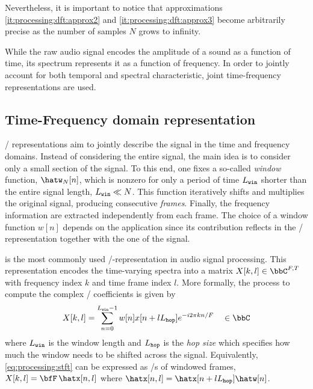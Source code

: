Nevertheless, it is important to notice that approximations \ref{it:processing:dft:approx2} and \ref{it:processing:dft:approx3} become arbitrarily precise as the number of samples $N$ grows to infinity.

\mynewline
While the raw audio signal encodes the amplitude of a sound as a function of time,
its spectrum represents it as a function of frequency.
In order to jointly account for both temporal and spectral characteristic, joint time-frequency representations are used.

\subsection{Time-Frequency domain representation}
\TFdef/ representations aim to jointly describe the signal in the time and frequency domains.
Instead of considering the entire signal, the main idea is to consider only a small section of the signal.
To this end, one fixes a so-called \textit{window} function, $\hatw_N[n]$, which is nonzero for only a period of time $L_\mathtt{win}$ shorter than the entire signal length, $L_\mathtt{win} \ll N$.
This function iteratively shifts and multiplies the original signal, producing consecutive \textit{frames}.
Finally, the frequency information are extracted independently from each frame.
The choice of a window function $w[n]$ depends on the application since its contribution reflects in the \TF/ representation together with the
one of the signal.

is the most commonly used \TF/-representation in audio signal processing.
This representation encodes the time-varying spectra into a matrix $X[k,l] \in \bbC^{F,T}$ with frequency index $k$ and time frame index $l$.
More formally, the process to compute the complex \STFT/ coefficients is given by
\begin{equation}\label{eq:processing:stft}
    X[k, l]  = \sum_{n=0}^{\winsize-1} w[n] x[n + l \hopsize] \cste^{- \csti 2 \pi k n / F} \mathspace\in\bbC
\end{equation}
where $L_\mathtt{win}$ is the window length and $L_\mathtt{hop}$ is the \textit{hop size} which specifies how much the window needs to be shifted across the signal.
Equivalently, \cref{eq:processing:stft} can be expressed as \DFT/s of windowed frames, $X[k, l] = \discreteFT{\hatx[n,l]}$ where $\hatx[n,l] = \hatx[n + l \hopsize] \hatw[n]$.

